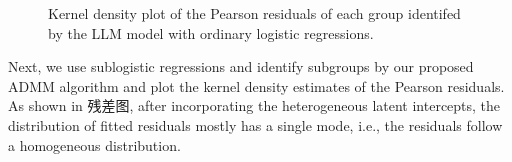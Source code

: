 \documentclass[11pt,onside,a4paper,fleqn]{report}
\begin{document}
\begin{figure}[htbp]
{      }
      \quad
      \caption{\small{Kernel density plot of the Pearson residuals of each group identifed by the LLM model with ordinary logistic regressions.}}
      \end{figure}
      
\hspace{0.8cm}Next, we use sublogistic regressions and identify subgroups by our proposed ADMM algorithm and plot the kernel density estimates of the Pearson residuals. As shown in 残差图, 
after incorporating the heterogeneous latent intercepts, the distribution of fitted residuals mostly has a single mode, i.e., the residuals follow a homogeneous distribution.
\end{document}
